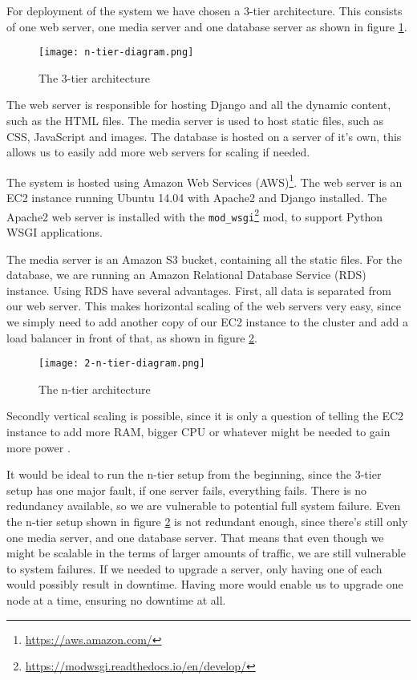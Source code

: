 For deployment of the system we have chosen a 3-tier architecture. This consists of one web server, one media server and one database server as shown in figure \ref{fig:3-tier}. 

\begin{figure}[H]
\capstart
	\centering
		\texttt{[image: n-tier-diagram.png]}
	\caption[]{The 3-tier architecture \label{fig:3-tier}}
\end{figure}

The web server is responsible for hosting Django and all the dynamic content, such as the HTML files. The media server is used to host static files, such as CSS, JavaScript and images. The database is hosted on a server of it's own, this allows us to easily add more web servers for scaling if needed.

The system is hosted using Amazon Web Services (AWS)\footnote{\url{https://aws.amazon.com/}}. The web server is an EC2 instance running Ubuntu 14.04 with Apache2 and Django installed. The Apache2 web server is installed with the \texttt{mod\_wsgi}\footnote{\url{https://modwsgi.readthedocs.io/en/develop/}} mod, to support Python WSGI applications.

The media server is an Amazon S3 bucket, containing all the static files. For the database, we are running an Amazon Relational Database Service (RDS) instance. Using RDS have several advantages. First, all data is separated from our web server. This makes horizontal scaling of the web servers very easy, since we simply need to add another copy of our EC2 instance to the cluster and add a load balancer in front of that, as shown in figure \ref{fig:n-tier}.

\begin{figure}[H]
\capstart
	\centering
		\texttt{[image: 2-n-tier-diagram.png]}
	\caption[]{The n-tier architecture \label{fig:n-tier}}
\end{figure}

Secondly vertical scaling is possible, since it is only a question of telling the EC2 instance to add more RAM, bigger CPU or whatever might be needed to gain more power \cite[p.~204]{henderson2006building}.

It would be ideal to run the n-tier setup from the beginning, since the 3-tier setup has one major fault, if one server fails, everything fails. There is no redundancy available, so we are vulnerable to potential full system failure. Even the n-tier setup shown in figure \ref{fig:n-tier} is not redundant enough, since there's still only one media server, and one database server. That means that even though we might be scalable in the terms of larger amounts of traffic, we are still vulnerable to system failures. If we needed to upgrade a server, only having one of each would possibly result in downtime. Having more would enable us to upgrade one node at a time, ensuring no downtime at all.

